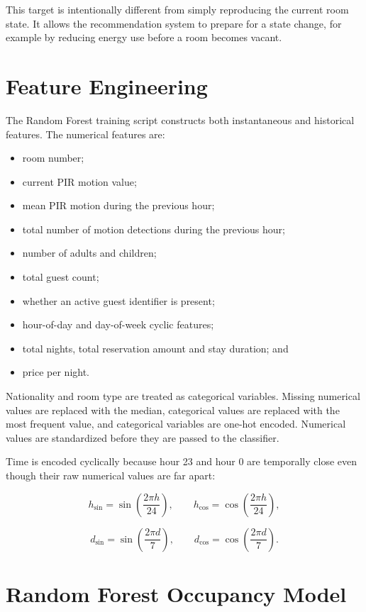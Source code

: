 This target is intentionally different from simply reproducing the current
room state. It allows the recommendation system to prepare for a state change,
for example by reducing energy use before a room becomes vacant.

\section{Feature Engineering}

The Random Forest training script constructs both instantaneous and historical
features. The numerical features are:

\begin{itemize}
    \item room number;
    \item current PIR motion value;
    \item mean PIR motion during the previous hour;
    \item total number of motion detections during the previous hour;
    \item number of adults and children;
    \item total guest count;
    \item whether an active guest identifier is present;
    \item hour-of-day and day-of-week cyclic features;
    \item total nights, total reservation amount and stay duration; and
    \item price per night.
\end{itemize}

Nationality and room type are treated as categorical variables. Missing
numerical values are replaced with the median, categorical values are replaced
with the most frequent value, and categorical variables are one-hot encoded.
Numerical values are standardized before they are passed to the classifier.

Time is encoded cyclically because hour 23 and hour 0 are temporally close even
though their raw numerical values are far apart:

\[
    h_{\sin} = \sin\left(\frac{2\pi h}{24}\right), \qquad
    h_{\cos} = \cos\left(\frac{2\pi h}{24}\right),
\]

\[
    d_{\sin} = \sin\left(\frac{2\pi d}{7}\right), \qquad
    d_{\cos} = \cos\left(\frac{2\pi d}{7}\right).
\]

\section{Random Forest Occupancy Model}

